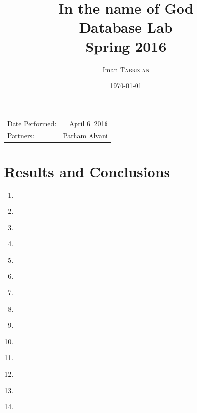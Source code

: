 \documentclass{article}
\title{In the name of God \\ Database Lab \\ Spring 2016} %
\author{Iman \textsc{Tabrizian}} %
\date{\today} %
\begin{document}
\maketitle %

\begin{center}
	\begin{tabular}{l r}
		Date Performed: & April 6, 2016 \\ %
		Partners: & Parham Alvani \\ %
	\end{tabular}
\end{center}



\section{Results and Conclusions}
\begin{enumerate}
	\item
		\inputminted{sql}{sql/impar-1.sql}
	\item
		\inputminted{sql}{sql/impar-1-a.sql}
	\item
		\inputminted{sql}{sql/impar-1-exec.sql}
	\item
		\inputminted{sql}{sql/impar-1-select.sql}
	\item
		\inputminted{sql}{sql/impar-1-upgrade.sql}
	\item
		\inputminted{sql}{sql/impar-2-exec.sql}
	\item
		\inputminted{sql}{sql/impar-3.sql}
	\item
		\inputminted{sql}{sql/impar-3-exec.sql}
	\item
		\inputminted{sql}{sql/impar-4.sql}
	\item
		\inputminted{sql}{sql/impar-4-1.sql}
	\item
		\inputminted{sql}{sql/impar-5.sql}
	\item
		\inputminted{sql}{sql/impar-6.sql}
	\item
		\inputminted{sql}{sql/impar-6-exec.sql}
	\item
		\inputminted{sql}{sql/impar-7.sql}
\end{enumerate}
\end{document}
